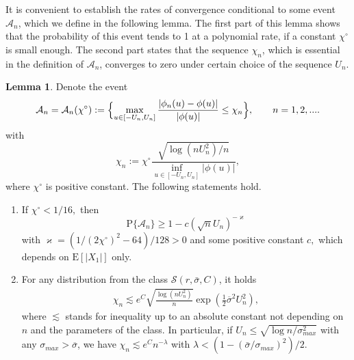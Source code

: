 \documentclass[a4paper,11pt]{article}
\theoremstyle{definition}
\newcommand{\1}{\mathbb{I}}
\newcommand{\A}{\mathscr{A}}
\renewcommand{\A}{\mathcal{A}}
\newcommand{\E}{{\mathrm E}}
\renewcommand{\P}{{\mathrm P}}
\renewcommand{\kappa}{\varkappa}
\newtheorem{lem}{Lemma}
\theoremstyle{remark}
\begin{document}





 It is convenient to establish the rates of convergence conditional to some event \(\A_n\), which we define in the following lemma. The first part of this lemma shows that the probability of this event tends to 1 at a polynomial rate, if a constant \(\chi^\circ\) is small enough. The second part states that the sequence \(\chi_n\), which is essential in the definition of \(\A_n\), converges to zero under certain choice of the sequence \(U_n.\)
\begin{lem}\label{lem1}
Denote the event 
\begin{equation*}
    \mathcal{A}_n = \mathcal{A}_n (\chi^\circ) := \Bigl\{\max_{u \in [-U_n,U_n]} \frac{|\phi_n(u) - \phi(u)|}{|\phi(u)|} \leq \chi_n \Bigr\}, \qquad n=1,2,....
\end{equation*}
with \[\chi_n := \chi^\circ \frac{\sqrt{\log(nU_n^2)/ n}}{\inf_{u \in [-U_n, U_n]}|\phi(u)|},\]
where \(\chi^\circ\) is positive constant.
The following statements hold.
\begin{enumerate}
\item[(i)] If \(\chi^\circ < 1/16,\) then 
 \[\P\{\A_n\} \geq 1-c (\sqrt{n}U_n)^{-\kappa}\] with \(\kappa= (1/(2\chi^\circ)^2-64) / 128>0\) and some positive constant \(c,\) which  depends on \(\E[|X_1|]\) only.
 \item[(ii)] For any distribution from the class \(\mathcal{S}(r, \bar{\sigma}, C)\),  it holds 
 \begin{eqnarray*}
 \chi_n\lesssim  e^{C}
  \sqrt{\frac{\log(nU_n^2)}{n}}
\exp(\frac{1}{2}\overline{\sigma}^2U_n^2),
\end{eqnarray*}
where  $ \lesssim $ stands for inequality up to an absolute constant not depending on \(n\) and the parameters of the class. In particular, if \(U_n \leq \sqrt{\log n /\sigma^2_{max}}\) with any $\sigma_{max} > \overline{\sigma}$, we have  \(\chi_n \lesssim e^C n^{-\lambda}\) with \(\lambda<(1-(\bar{\sigma}/\sigma_{max})^2)/2\).

 \end{enumerate}\end{lem}
\end{document}
